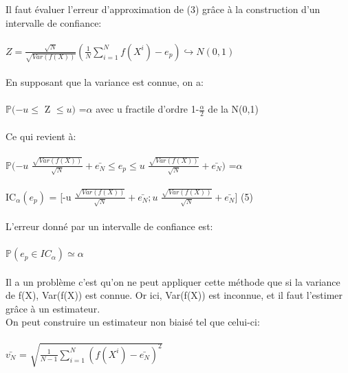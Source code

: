 \documentclass[12pt]{report}
\begin{document}
Il faut évaluer l’erreur d’approximation de (3)  grâce à la
construction d’un intervalle de confiance:\\\\
$Z = \frac{\sqrt{N}}{\sqrt{Var(f(X))}} (\frac{1}{N}\sum_{i=1}^{N}f(X^i)-e_p)\hookrightarrow N(0,1)$\\\\
En supposant que la variance est connue, on a:\\\\
$\mathbb{P}(-u\leq$ Z $\leq u)$ =$ \alpha$ avec u fractile d'ordre 1-$\frac{\alpha}{2}$ de la N(0,1)\\\\
Ce qui revient à:\\\\
$\mathbb{P}(-u$ $\frac{\sqrt{Var(f(X))}}{\sqrt{N}}+\bar{e_N}\leq e_p \leq u$ $\frac{\sqrt{Var(f(X))}}{\sqrt{N}}+\bar{e_N})$ =$ \alpha$ \\\\
IC$_\alpha(e_p)$ = [-u $\frac{\sqrt{Var(f(X))}}{\sqrt{N}}+\bar{e_N};u$ $\frac{\sqrt{Var(f(X))}}{\sqrt{N}}+\bar{e_N}]$ \hspace{2cm} (5)\\\\
L’erreur donné par un intervalle de confiance est:\\\\
$\mathbb{P}(e_p\in IC_\alpha ) \simeq \alpha$ \\\\
Il a un problème c’est qu’on ne peut appliquer cette méthode que si la variance de f(X), Var(f(X)) est connue. Or ici, Var(f(X)) est inconnue, et il faut l’estimer grâce à un estimateur.\\ On peut construire un estimateur non biaisé tel que celui-ci:\\\\
$\bar{v_N}$ = $\sqrt{\frac{1}{N-1}\sum_{i=1}^{N}(f(X^i)-\bar{e_N})^2}$ \\\\\\\\\\\\\\\\\\\\
\end{document}
